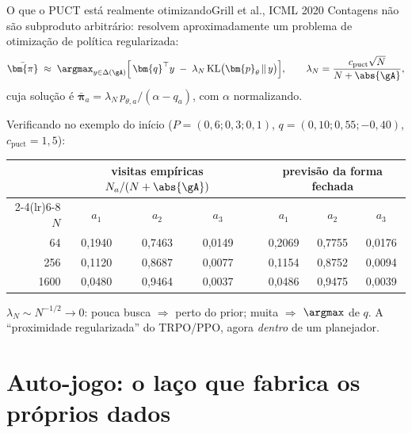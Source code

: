 \documentclass[aspectratio=169, 10pt]{beamer}
\newcommand{\cpuct}{c_{\mathrm{puct}}}
\newcommand{\Nvis}{N}
\newcommand{\redepol}{\bm{p}_{\theta}}
\newcommand{\raizpol}{\bm{\pi}}
\begin{document}
\begin{frame}{O que o PUCT está realmente otimizando}{Grill et al., ICML 2020}
  \footnotesize
  Contagens não são subproduto arbitrário: resolvem aproximadamente um \alert{problema de otimização de política regularizada}:
  \[
    \bar{\raizpol} \;\approx\; \argmax_{y \in \Delta(\gA)}
      \Bigl[\, \bm{q}^{\top} y \;-\; \lambda_{\Nvis}\,\mathrm{KL}\bigl(\redepol \,\|\, y\bigr) \Bigr],
    \qquad
    \lambda_{\Nvis} = \frac{\cpuct \sqrt{\Nvis}}{\Nvis + \abs{\gA}},
  \]
  cuja solução é
  $\bar{\raizpol}_a = \lambda_{\Nvis}\, p_{\theta,a} / (\alpha - q_a)$, com $\alpha$ normalizando.
  \smallskip

  Verificando no exemplo do início ($P=(0{,}6;0{,}3;0{,}1)$, $q=(0{,}10;0{,}55;-0{,}40)$, $\cpuct=1{,}5$):

  \centering\tiny
  \begin{tabular}{r ccc c ccc}
    \toprule
    & \multicolumn{3}{c}{visitas empíricas $\Nvis_a/(\Nvis+\abs{\gA})$} && \multicolumn{3}{c}{previsão da forma fechada} \\
    \cmidrule(lr){2-4}\cmidrule(lr){6-8}
    $\Nvis$ & $a_1$ & $a_2$ & $a_3$ && $a_1$ & $a_2$ & $a_3$ \\
    \midrule
    64   & 0,1940 & 0,7463 & 0,0149 && 0,2069 & 0,7755 & 0,0176 \\
    256  & 0,1120 & 0,8687 & 0,0077 && 0,1154 & 0,8752 & 0,0094 \\
    1600 & 0,0480 & 0,9464 & 0,0037 && 0,0486 & 0,9475 & 0,0039 \\
    \bottomrule
  \end{tabular}

  \medskip
  \vspace{-0.35em}
  \begin{ideiabox}
    $\lambda_{\Nvis} \sim \Nvis^{-1/2} \to 0$: pouca busca $\Rightarrow$ perto do prior; muita $\Rightarrow$ $\argmax$ de $q$. A ``proximidade regularizada'' do TRPO/PPO, agora \emph{dentro} de um planejador.
  \end{ideiabox}
\end{frame}

\section{Auto-jogo: o laço que fabrica os próprios dados}
\end{document}
